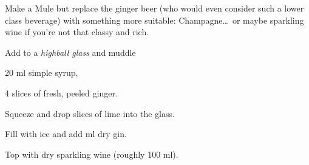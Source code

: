 \startsection[title={Millionaire's Mule},reference=millionairesmule]
Make a Mule but replace the ginger beer (who would even consider such a
lower class beverage) with something more suitable: Champagne\dots\ or
maybe sparkling wine if you're not that classy and rich.

\startitemize
\item Add to a {\em highball glass} and muddle
      \startitemize
      \item 20 ml simple syrup,
      \item 4 slices of fresh, peeled ginger.
      \stopitemize
\item Squeeze and drop  slices of lime into the glass.
\item Fill with ice and add  ml dry gin.
\item Top with \tr dry sparkling wine (roughly 100 ml).
\stopitemize
\stopsection
